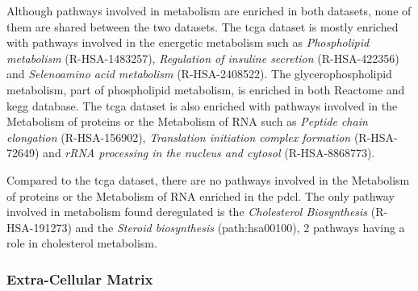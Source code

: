 Although pathways involved in metabolism are enriched in both datasets, none of them are shared between the two datasets.
The \acrshort{tcga} dataset is mostly enriched with pathways involved in the energetic metabolism such as \textit{Phospholipid metabolism} (R-HSA-1483257), \textit{Regulation of insuline secretion} (R-HSA-422356) and \textit{Selenoamino acid metabolism} (R-HSA-2408522).
The glycerophospholipid metabolism, part of phospholipid metabolism, is enriched in both Reactome and \acrshort{kegg} database.
The \acrshort{tcga} dataset is also enriched with pathways involved in the Metabolism of proteins or the Metabolism of RNA such as \textit{Peptide chain elongation} (R-HSA-156902), \textit{Translation initiation complex formation} (R-HSA-72649) and \textit{rRNA processing in the nucleus and cytosol} (R-HSA-8868773).

Compared to the \acrshort{tcga} dataset, there are no pathways involved in the Metabolism of proteins or the Metabolism of RNA enriched in the \acrshort{pdcl}.
The only pathway involved in metabolism found deregulated is the \textit{Cholesterol Biosynthesis} (R-HSA-191273) and the \textit{Steroid biosynthesis} (path:hsa00100), 2 pathways having a role in cholesterol metabolism.

\subsubsection{Extra-Cellular Matrix}

